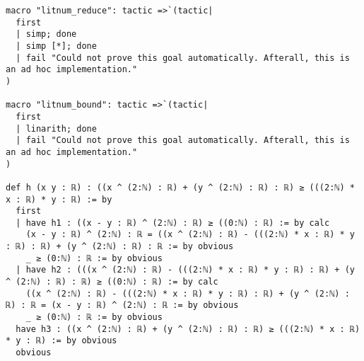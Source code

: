 \documentclass{article}
\begin{document}
\begin{tcolorbox}[colback=white!10, width=\linewidth]
\begin{lstlisting}[language=Lean4]
macro "litnum_reduce": tactic =>`(tactic|
  first
  | simp; done
  | simp [*]; done
  | fail "Could not prove this goal automatically. Afterall, this is an ad hoc implementation."
)

macro "litnum_bound": tactic =>`(tactic|
  first
  | linarith; done
  | fail "Could not prove this goal automatically. Afterall, this is an ad hoc implementation."
)

def h (x y : ℝ) : ((x ^ (2:ℕ) : ℝ) + (y ^ (2:ℕ) : ℝ) : ℝ) ≥ (((2:ℕ) * x : ℝ) * y : ℝ) := by
  first
  | have h1 : ((x - y : ℝ) ^ (2:ℕ) : ℝ) ≥ ((0:ℕ) : ℝ) := by calc
    (x - y : ℝ) ^ (2:ℕ) : ℝ = ((x ^ (2:ℕ) : ℝ) - (((2:ℕ) * x : ℝ) * y : ℝ) : ℝ) + (y ^ (2:ℕ) : ℝ) : ℝ := by obvious
    _ ≥ (0:ℕ) : ℝ := by obvious
  | have h2 : (((x ^ (2:ℕ) : ℝ) - (((2:ℕ) * x : ℝ) * y : ℝ) : ℝ) + (y ^ (2:ℕ) : ℝ) : ℝ) ≥ ((0:ℕ) : ℝ) := by calc
    ((x ^ (2:ℕ) : ℝ) - (((2:ℕ) * x : ℝ) * y : ℝ) : ℝ) + (y ^ (2:ℕ) : ℝ) : ℝ = (x - y : ℝ) ^ (2:ℕ) : ℝ := by obvious
    _ ≥ (0:ℕ) : ℝ := by obvious
  have h3 : ((x ^ (2:ℕ) : ℝ) + (y ^ (2:ℕ) : ℝ) : ℝ) ≥ (((2:ℕ) * x : ℝ) * y : ℝ) := by obvious
  obvious

\end{lstlisting}
\end{tcolorbox}
\end{document}

